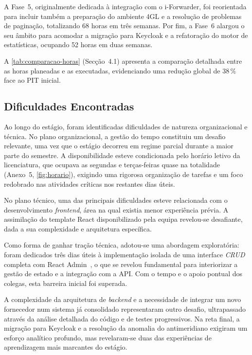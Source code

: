 \documentclass[a4paper,12pt]{report}
\begin{document}
A Fase~5, originalmente dedicada à integração com o i-Forwarder, foi reorientada para incluir também a preparação do ambiente 4GL e a resolução de problemas de paginação, totalizando 68 horas em três semanas. Por fim, a Fase~6 alargou o seu âmbito para acomodar a migração para Keycloak e a refatoração do motor de estatísticas, ocupando 52 horas em duas semanas.

A \autoref{tab:comparacao-horas} (Secção~4.1) apresenta a comparação detalhada entre as horas planeadas e as executadas, evidenciando uma redução global de 38\,\% face ao PIT inicial.

\subsection{Dificuldades Encontradas}

Ao longo do estágio, foram identificadas dificuldades de natureza organizacional e técnica. No plano organizacional, a gestão do tempo constituiu um desafio relevante, uma vez que o estágio decorreu em regime parcial durante a maior parte do semestre. A disponibilidade esteve condicionada pelo horário letivo da licenciatura, que ocupava as segundas e terças-feiras quase na totalidade (Anexo~5, \autoref{fig:horario}), exigindo uma rigorosa organização de tarefas e um foco redobrado nas atividades críticas nos restantes dias úteis.

No plano técnico, uma das principais dificuldades esteve relacionada com o desenvolvimento \textit{frontend}, área na qual existia menor experiência prévia. A assimilação do template React disponibilizado pela equipa revelou-se desafiante, dada a sua complexidade e arquitetura específica.

Como forma de ganhar tração técnica, adotou-se uma abordagem exploratória: foram dedicados três dias úteis à implementação isolada de uma interface \textit{CRUD} completa com React Admin~\cite{reactadmin}, o que se revelou fundamental para interiorizar a gestão de estado e a integração com a API. Com o tempo e o apoio pontual dos colegas, esta barreira inicial foi superada.

A complexidade da arquitetura de \textit{backend} e a necessidade de integrar um novo fornecedor num sistema já consolidado representaram outro desafio, ultrapassado através da análise detalhada do código e de testes progressivos. Na reta final, a migração para Keycloak e a resolução da anomalia do antimeridiano exigiram um esforço analítico profundo, mas revelaram-se duas das experiências de aprendizagem mais marcantes do estágio.
\end{document}
